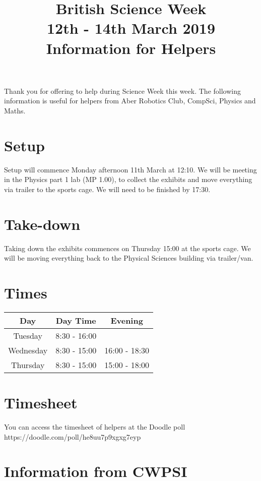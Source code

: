 \documentclass[a4paper]{article}
\title{British Science Week\\12th - 14th March 2019\\Information for Helpers}
\date{}
\begin{document}
\long{}
\maketitle

\noindent
Thank you for offering to help during Science Week this week. The following information is useful for helpers from Aber Robotics Club, CompSci, Physics and Maths.

\section*{Setup}
Setup will commence Monday afternoon 11th March at 12:10. We will be meeting in the Physics part 1 lab (MP 1.00), to collect the exhibits and move everything via trailer to the sports cage. We will need to be finished by 17:30.

\section*{Take-down}
Taking down the exhibits commences on Thursday 15:00 at the sports cage. We will be moving everything back to the Physical Sciences building via trailer/van.

\section*{Times}
\begin{center}
\begin{tabular}{ |c|c|c| } 
\hline
Day & Day Time & Evening \\
\hline
\hline
Tuesday & 8:30 - 16:00 &  \\ 
\hline
Wednesday & 8:30 - 15:00 & 16:00 - 18:30 \\ 
\hline
Thursday & 8:30 - 15:00 & 15:00 - 18:00 \\ 
\hline
\end{tabular}
\end{center}

\section*{Timesheet}
You can access the timesheet of helpers at the Doodle poll https://doodle.com/poll/he8uu7p9xgxg7eyp


\section*{Information from CWPSI}
\end{document}
